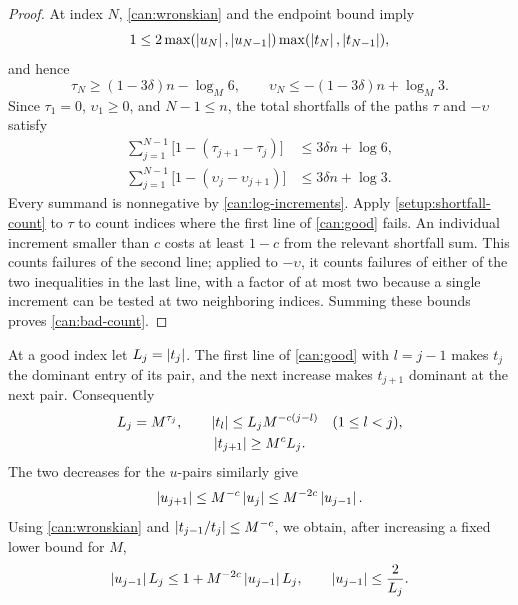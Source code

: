 \begin{proof}
At index $N$, \cref{can:wronskian} and the endpoint bound imply
\[
1\le 2\max(\left\lvert u_N\right\rvert,\left\lvert u_{N-1}\right\rvert)
          \max(\left\lvert t_N\right\rvert,\left\lvert t_{N-1}\right\rvert),
\]
and hence
\[
\tau_N\ge(1-3\delta)n-\log_M6,
\qquad
\upsilon_N\le-(1-3\delta)n+\log_M3.
\]
Since $\tau_1=0$, $\upsilon_1\ge0$, and $N-1\le n$, the total
shortfalls of the paths $\tau$ and $-\upsilon$ satisfy
\begin{align*}
\sum_{j=1}^{N-1}\bigl[1-(\tau_{j+1}-\tau_j)\bigr]
&\le3\delta n+\log6,\\
\sum_{j=1}^{N-1}\bigl[1-(\upsilon_j-\upsilon_{j+1})\bigr]
&\le3\delta n+\log3.
\end{align*}
Every summand is nonnegative by \cref{can:log-increments}.  Apply
\cref{setup:shortfall-count} to $\tau$ to count indices where the first
line of \cref{can:good} fails.  An individual increment smaller than $c$
costs at least $1-c$ from the relevant shortfall sum.  This counts
failures of the second line; applied to $-\upsilon$, it counts failures
of either of the two inequalities in the last line, with a factor of at
most two because a single increment can be tested at two neighboring
indices.  Summing these bounds proves \cref{can:bad-count}.
\end{proof}

At a good index let $L_j=\left\lvert t_j\right\rvert$.  The first line of
\cref{can:good} with $l=j-1$ makes $t_j$ the dominant entry of its pair,
and the next increase makes $t_{j+1}$ dominant at the next pair.
Consequently
\begin{equation}\label{can:good-t}
\begin{gathered}
L_j=M^{\tau_j},\qquad
\left\lvert t_l\right\rvert\le L_jM^{-c(j-l)}\quad(1\le l<j),\\
\left\lvert t_{j+1}\right\rvert\ge M^cL_j.
\end{gathered}
\end{equation}
The two decreases for the $u$-pairs similarly give
\[
\left\lvert u_{j+1}\right\rvert\le M^{-c}\left\lvert u_j\right\rvert
\le M^{-2c}\left\lvert u_{j-1}\right\rvert.
\]
Using \cref{can:wronskian} and
$\left\lvert t_{j-1}/t_j\right\rvert\le M^{-c}$, we obtain, after increasing a fixed
lower bound for $M$,
\begin{equation}\label{can:good-u}
\left\lvert u_{j-1}\right\rvert L_j
\le 1+M^{-2c}\left\lvert u_{j-1}\right\rvert L_j,
\qquad \left\lvert u_{j-1}\right\rvert\le\frac2{L_j}.
\end{equation}

